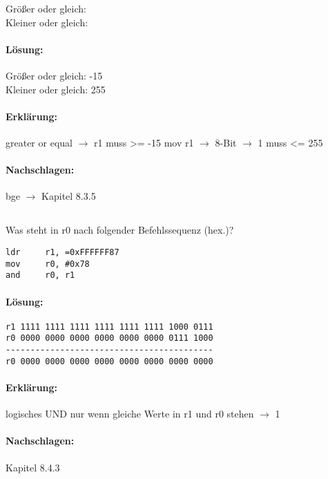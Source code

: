 Größer oder gleich:\\
Kleiner oder gleich:\\

\paragraph*{Lösung:}
Größer oder gleich: -15\\
Kleiner oder gleich: 255\\

\paragraph*{Erklärung:}
greater or equal $\rightarrow$ r1 muss >= -15 
mov r1 $\rightarrow$ 8-Bit $\rightarrow$ 1 muss <= 255

\paragraph*{Nachschlagen:}
bge $\rightarrow$ Kapitel 8.3.5

\subsection{}
Was steht in r0 nach folgender Befehlssequenz (hex.)?
\begin{lstlisting}
ldr		r1, =0xFFFFFF87
mov		r0, #0x78
and		r0, r1
\end{lstlisting}

\paragraph*{Lösung:}

\begin{lstlisting}
r1 1111 1111 1111 1111 1111 1111 1000 0111
r0 0000 0000 0000 0000 0000 0000 0111 1000
------------------------------------------
r0 0000 0000 0000 0000 0000 0000 0000 0000
\end{lstlisting}

\paragraph*{Erklärung:}
logisches UND nur wenn gleiche Werte in r1 und r0 stehen $\rightarrow$ 1

\paragraph*{Nachschlagen:}
Kapitel 8.4.3